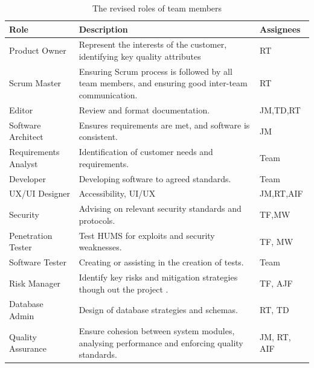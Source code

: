 \begin{table}[H]
\begin{tabular}{ | p{3.5cm} | p{8.5cm} | p{2cm} |}
\hline
\rowcolor{titleColor}\textbf{Role}
&  \textbf{Description} 
& \textbf{Assignees} \\ \hline

Product Owner & Represent the interests of the customer, identifying key quality attributes & RT \\ \hline

Scrum Master  &   Ensuring Scrum process is followed by all team members, and ensuring good inter-team communication.            		& RT           				\\ \hline
Editor  &   Review and format documentation. & JM,TD,RT \\ \hline

Software Architect  &  Ensures requirements are met, and software is consistent. & JM \\ \hline

Requirements Analyst  &   Identification of customer needs and requirements.  & Team \\ \hline

Developer &   Developing software to agreed standards. &  Team     \\ \hline

UX/UI Designer    &   Accessibility, UI/UX	& JM,RT,AIF    \\ \hline

Security    &   Advising on relevant security standards and protocols. & TF,MW  \\ \hline

Penetration Tester & Test HUMS for exploits and security weaknesses. &TF, MW \\ \hline

Software Tester &   Creating or assisting in the creation of tests. & Team  	 \\ \hline

Risk Manager &   Identify key risks and mitigation strategies though out the project .  & TF, AJF \\ \hline

Database Admin &   Design of database strategies and schemas. & RT, TD                   \\ \hline
Quality Assurance   &   Ensure cohesion between system modules, analysing performance and enforcing quality standards.  & JM, RT, AIF \\ \hline
\end{tabular}
\caption{The revised roles of team members}
\label{tab:roles}
\end{table}

